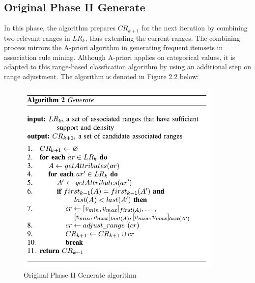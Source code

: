 \subsection{Original Phase II Generate}
In this phase, the algorithm prepares $CR_{k+1}$ for the next iteration by combining two relevant ranges in $LR_k$, thus extending the current ranges. The combining process mirrors the A-priori algorithm in generating frequent itemsets in association rule mining. Although A-priori applies on categorical values, it is adapted to this range-based classfication algorithm by using an additional step on range adjustment. The algorithm is denoted in Figure 2.2 below: 

\begin{figure}[h]
    \centering
    \includegraphics[width=4in]{figures/DrShaoAlgorithm2}
    \caption[Original Phase II Generate algorithm]{Original Phase II Generate algorithm}
    \label{fig:figure2_2}
\end{figure}

